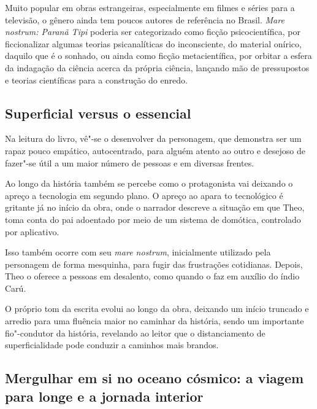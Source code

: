 \documentclass[12pt]{extarticle}
\begin{document}
Muito popular em obras estrangeiras, especialmente em filmes e séries para a
televisão, o gênero ainda tem poucos autores de referência no Brasil.
\textit{Mare nostrum: Paranã Tipi} poderia ser categorizado como ficção
psicocientífica, por ficcionalizar algumas teorias psicanalíticas do
inconsciente, do material onírico, daquilo que é o sonhado, ou ainda como
ficção metacientífica, por orbitar a esfera da indagação da ciência acerca da
própria ciência, lançando mão de pressupostos e teorias científicas para a
construção do enredo.




\subsection{Superficial versus o essencial}
Na leitura do livro, vê"-se o desenvolver da personagem, que demonstra
ser um rapaz pouco empático, autocentrado, para alguém atento ao outro e
desejoso de fazer"-se útil a um maior número de pessoas e em
diversas frentes.

Ao longo da história também se percebe como o protagonista vai deixando
o apreço a tecnologia em segundo plano. O apreço ao apara to tecnológico é
gritante já no início da obra, onde o narrador descreve a situação em que
Theo, toma conta do pai adoentado por meio de um
sistema de domótica, controlado por aplicativo.

Isso também ocorre com seu \emph{mare nostrum}, inicialmente utilizado
pela personagem de forma mesquinha, para fugir das frustrações
cotidianas. Depois, Theo o oferece a pessoas em desalento, como quando o
faz em auxílio do índio Carú.

O próprio tom da escrita evolui ao longo da obra, deixando um início
truncado e arredio para uma fluência maior no caminhar da
história, sendo um importante fio"-condutor da história, revelando
ao leitor que o distanciamento de superficialidade pode conduzir a
caminhos mais brandos.


\subsection{Mergulhar em si no oceano cósmico: a viagem para longe e a
jornada interior}
\end{document}
